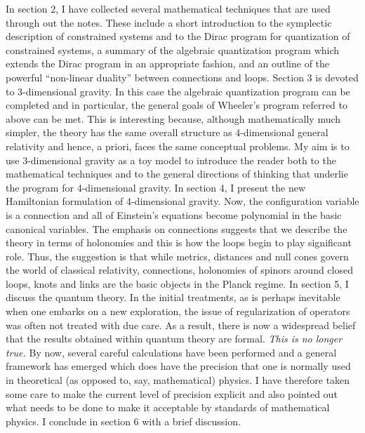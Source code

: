 In section 2, I have collected several mathematical techniques that are
used through out the notes. These include a short introduction to the
symplectic description of constrained systems and to the Dirac program for
quantization of constrained systems, a summary of the algebraic quantization
program which extends the Dirac program in an appropriate fashion, and an
outline of the powerful ``non-linear duality'' between connections and loops.
Section 3 is devoted to 3-dimensional gravity. In this case the algebraic
quantization program can be completed and in particular, the general goals
of Wheeler's program referred to above can be met. This is interesting because,
although mathematically much simpler, the theory has the same overall
structure as 4-dimensional general relativity and hence, a priori, faces the
same conceptual problems. My aim is to use 3-dimensional gravity as a
toy model to introduce the reader both to the mathematical techniques
and to the general directions of thinking that underlie the program for
4-dimensional gravity. In section 4, I present the new Hamiltonian formulation
of 4-dimensional gravity. Now, the configuration variable is a connection
and all of Einstein's equations become polynomial in the basic canonical
variables. The emphasis on connections suggests that we describe the theory
in terms of holonomies and this is how the loops begin to play  significant
role. Thus, the suggestion is that while metrics, distances and null cones
govern the world of classical relativity, connections, holonomies of spinors
around closed loops, knots and links are the basic objects in the Planck
regime. In section 5, I discuss the quantum theory. In the initial
treatments, as is perhaps inevitable when one embarks on a new exploration,
the issue of regularization of operators was often not treated
with due care. As a result, there is now a widespread belief that the
results obtained within quantum theory are formal. {\it This is no longer
true.} By now, several careful calculations have been performed and a general
framework has emerged which does have the precision that one is normally
used in theoretical (as opposed to, say, mathematical) physics. I have
therefore taken some care to make the current level of precision explicit
and also pointed out what needs to be done to make it acceptable by
standards of mathematical physics. I conclude in section 6 with a brief
discussion.

